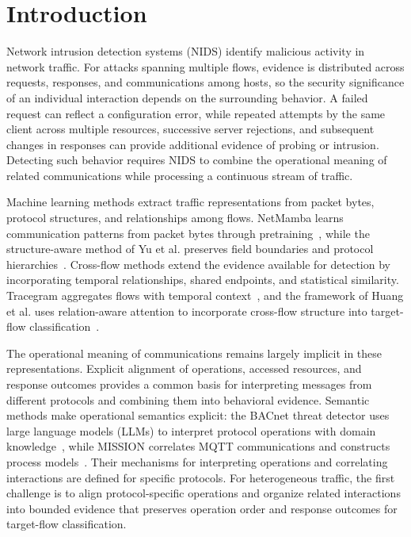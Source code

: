 \section{Introduction}
\label{sec:introduction}

Network intrusion detection systems (NIDS) identify malicious activity in network traffic.
For attacks spanning multiple flows, evidence is distributed across requests, responses, and communications among hosts, so the security significance of an individual interaction depends on the surrounding behavior.
A failed request can reflect a configuration error, while repeated attempts by the same client across multiple resources, successive server rejections, and subsequent changes in responses can provide additional evidence of probing or intrusion.
Detecting such behavior requires NIDS to combine the operational meaning of related communications while processing a continuous stream of traffic.

Machine learning methods extract traffic representations from packet bytes, protocol structures, and relationships among flows.
NetMamba learns communication patterns from packet bytes through pretraining~\cite{R06}, while the structure-aware method of Yu et al. preserves field boundaries and protocol hierarchies~\cite{E01}.
Cross-flow methods extend the evidence available for detection by incorporating temporal relationships, shared endpoints, and statistical similarity.
Tracegram aggregates flows with temporal context~\cite{R01}, and the framework of Huang et al. uses relation-aware attention to incorporate cross-flow structure into target-flow classification~\cite{R07}.

The operational meaning of communications remains largely implicit in these representations.
Explicit alignment of operations, accessed resources, and response outcomes provides a common basis for interpreting messages from different protocols and combining them into behavioral evidence.
Semantic methods make operational semantics explicit: the BACnet threat detector uses large language models (LLMs) to interpret protocol operations with domain knowledge~\cite{R12}, while MISSION correlates MQTT communications and constructs process models~\cite{R13}.
Their mechanisms for interpreting operations and correlating interactions are defined for specific protocols.
For heterogeneous traffic, the first challenge is to align protocol-specific operations and organize related interactions into bounded evidence that preserves operation order and response outcomes for target-flow classification.

